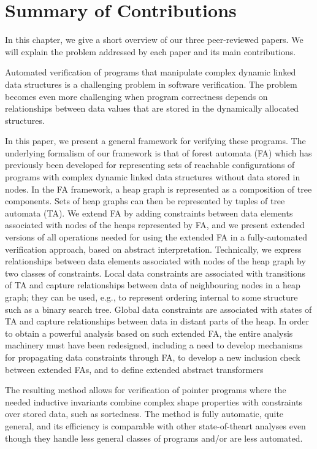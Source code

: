 \chapter{Summary of Contributions}

In this chapter, we give a short overview of our three peer-reviewed papers. We
will explain the problem addressed by each paper and its main contributions.
\		   

Automated verification of programs that manipulate complex dynamic linked data structures is a challenging problem in software verification. The problem becomes even more challenging when program correctness depends on relationships between data values that are stored in the dynamically allocated structures. 

In this paper, we present a general framework for verifying these programs. The underlying formalism of our framework is that
of forest automata (FA) which
has previously been developed for representing sets of reachable configurations of programs with complex dynamic linked data structures without data stored in nodes. In the FA framework, a heap
graph is represented as a composition of tree components. Sets of heap graphs can then
be represented by tuples of tree automata (TA). We extend FA by adding constraints between data elements associated with nodes of the heaps represented by FA, and we present extended versions of all operations needed for using the extended FA in a fully-automated verification approach, based on abstract interpretation.  
Technically, we express relationships between data elements associated with nodes of the heap graph by two classes of constraints. Local data constraints are associated with transitions of TA and capture relationships between data of neighbouring nodes in a heap graph; they
can be used, e.g., to represent ordering internal to some structure such as a binary search
tree. Global data constraints are associated with states of TA and capture relationships
between data in distant parts of the heap. In order to obtain a powerful analysis based on
such extended FA, the entire analysis machinery must have been redesigned, including
a need to develop mechanisms for propagating data constraints through FA, to develop a new inclusion check between
extended FAs, and to define extended abstract transformers

The resulting method allows for verification of pointer programs where the needed inductive invariants combine complex shape properties with constraints over stored data, such as sortedness. The method is fully automatic, quite general, and its efficiency is comparable with other state-of-theart analyses even though they handle less general classes of programs and/or are less automated. 







